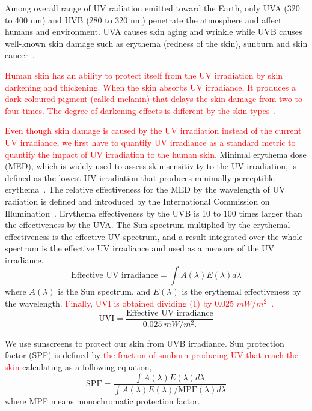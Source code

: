 \documentclass[journal]{IEEEtran}
\begin{document}
Among overall range of UV radiation emitted toward the Earth, only UVA (320 to 400 nm) and UVB (280 to 320 nm) penetrate the atmosphere and affect humans and environment. UVA causes skin aging and wrinkle while UVB causes well-known skin damage such as erythema (redness of the skin), sunburn and skin cancer~\cite{Matsumura:TAP04}.

\textcolor{red}{Human skin has an ability to protect itself from the UV irradiation by skin darkening and thickening. When the skin absorbs UV irradiance, It produces a dark-coloured pigment (called melanin) that delays the skin damage from two to four times. The degree of darkening effects is different by the skin types~\cite{Harrison:Method02}.}

\textcolor{red}{Even though skin damage is caused by the UV irradiation instead of the current UV irradiance, we first have to quantify UV irradiance as  a standard metric to quantify the impact of UV irradiation to the human skin.}
Minimal erythema dose (MED), which is widely used to assess skin sensitivity to the UV irradiation, is defined as the lowest UV irradiation that produces minimally perceptible erythema~\cite{Diffey:CPPM91}. The relative effectiveness for the MED by the wavelength of UV radiation is defined and introduced by the International Commission on Illumination~\cite{CIE}. Erythema effectiveness by the UVB is 10 to 100 times larger than the effectiveness by the UVA. The Sun spectrum multiplied by the erythemal effectiveness is the effective UV spectrum, and a result integrated over the whole spectrum is the effective UV irradiance and used as a measure of the UV irradiance.
\begin{equation}
\text{Effective~UV~irradiance} = \int A(\lambda)E(\lambda) d \lambda
 \end{equation}
where $A(\lambda)$ is the Sun spectrum, and $E(\lambda)$ is the erythemal effectiveness by the wavelength. \textcolor{red}{Finally, UVI is obtained dividing (1) by 0.025 $mW/m^2$~\cite{CIE}.}
\begin{equation}
\text{UVI}= \frac{\text{Effective~UV~irradiance}}{0.025~mW/m^2.}
 \end{equation}

We use sunscreens to protect our skin from UVB irradiance. Sun protection factor (SPF) is defined by \textcolor{red}{the fraction of sunburn-producing UV that reach the skin} calculating as a following equation,
\begin{equation}
\text{SPF} = \frac{\int A(\lambda)E(\lambda) d \lambda}{\int A(\lambda)E(\lambda) / \text{MPF}(\lambda) d \lambda}
 \end{equation}
where MPF means monochromatic protection factor.
\end{document}
